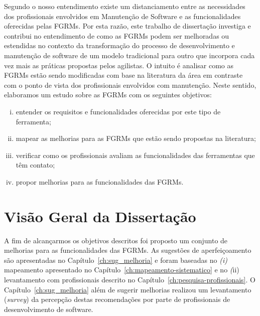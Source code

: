 Segundo o nosso entendimento existe um distanciamento entre as necessidades dos
profissionais envolvidos em Manutenção de Software e as funcionalidades
oferecidas pelas FGRMs\@. Por esta razão, este trabalho de dissertação investiga
e contribui no entendimento de como as FGRMs podem ser melhoradas ou estendidas
no contexto da transformação do processo de desenvolvimento e manutenção de
software de um modelo tradicional para outro que incorpora cada vez mais as
práticas propostas pelos agilistas. O intuito é analisar como as FGRMs estão
sendo modificadas com base na literatura da área em contraste com o ponto de
vista dos profissionais envolvidos com manutenção. Neste sentido, elaboramos um
estudo sobre as FGRMs com os seguintes objetivos:

\begin{enumerate}[(i)]
	\item entender os requisitos e funcionalidades oferecidas por este tipo de
        ferramenta;
	\item mapear as melhorias para as FGRMs que estão sendo propostas na
		literatura;
    \item verificar como os profissionais avaliam as funcionalidades das
        ferramentas que têm contato;
	\item propor melhorias para as funcionalidades das FGRMs\@.
\end{enumerate}


\section{Visão Geral da Dissertação}\label{sec:intro-visao-geral}

A fim de alcançarmos os objetivos descritos foi proposto um conjunto de
melhorias para as funcionalidades das FGRMs. As sugestões de aperfeiçoamento
são apresentadas no Capítulo~\ref{ch:sug_melhoria} e foram baseadas no
\textit{(i)} mapeamento apresentado no Capítulo~\ref{ch:mapeamento-sistematico}
e no \textit(ii) levantamento com profissionais descrito no
Capítulo~\ref{ch:pesquisa-profissionais}. O Capítulo~\ref{ch:sug_melhoria} além
de sugerir melhorias realizou um levantamento (\textit{survey}) da percepção
destas recomendações por parte de profissionais de desenvolvimento de software.

